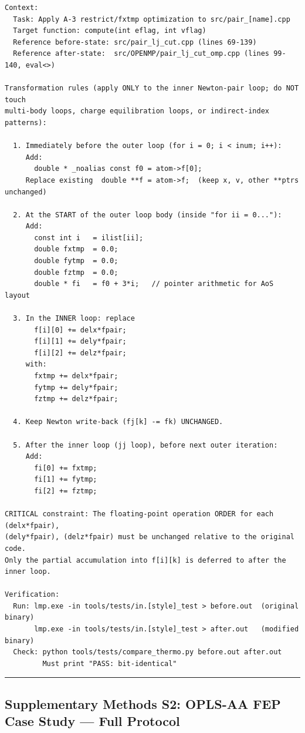 \documentclass[
  11pt,
]{article}
\begin{document}
\begin{verbatim}
Context:
  Task: Apply A-3 restrict/fxtmp optimization to src/pair_[name].cpp
  Target function: compute(int eflag, int vflag)
  Reference before-state: src/pair_lj_cut.cpp (lines 69-139)
  Reference after-state:  src/OPENMP/pair_lj_cut_omp.cpp (lines 99-140, eval<>)

Transformation rules (apply ONLY to the inner Newton-pair loop; do NOT touch
multi-body loops, charge equilibration loops, or indirect-index patterns):

  1. Immediately before the outer loop (for i = 0; i < inum; i++):
     Add:
       double * _noalias const f0 = atom->f[0];
     Replace existing  double **f = atom->f;  (keep x, v, other **ptrs unchanged)

  2. At the START of the outer loop body (inside "for ii = 0..."):
     Add:
       const int i   = ilist[ii];
       double fxtmp  = 0.0;
       double fytmp  = 0.0;
       double fztmp  = 0.0;
       double * fi   = f0 + 3*i;   // pointer arithmetic for AoS layout

  3. In the INNER loop: replace
       f[i][0] += delx*fpair;
       f[i][1] += dely*fpair;
       f[i][2] += delz*fpair;
     with:
       fxtmp += delx*fpair;
       fytmp += dely*fpair;
       fztmp += delz*fpair;

  4. Keep Newton write-back (fj[k] -= fk) UNCHANGED.

  5. After the inner loop (jj loop), before next outer iteration:
     Add:
       fi[0] += fxtmp;
       fi[1] += fytmp;
       fi[2] += fztmp;

CRITICAL constraint: The floating-point operation ORDER for each (delx*fpair),
(dely*fpair), (delz*fpair) must be unchanged relative to the original code.
Only the partial accumulation into f[i][k] is deferred to after the inner loop.

Verification:
  Run: lmp.exe -in tools/tests/in.[style]_test > before.out  (original binary)
       lmp.exe -in tools/tests/in.[style]_test > after.out   (modified binary)
  Check: python tools/tests/compare_thermo.py before.out after.out
         Must print "PASS: bit-identical"
\end{verbatim}

\begin{center}\rule{0.5\linewidth}{0.5pt}\end{center}

\subsection{Supplementary Methods S2: OPLS-AA FEP Case Study --- Full
Protocol}\label{supplementary-methods-s2-opls-aa-fep-case-study-full-protocol}
\end{document}
